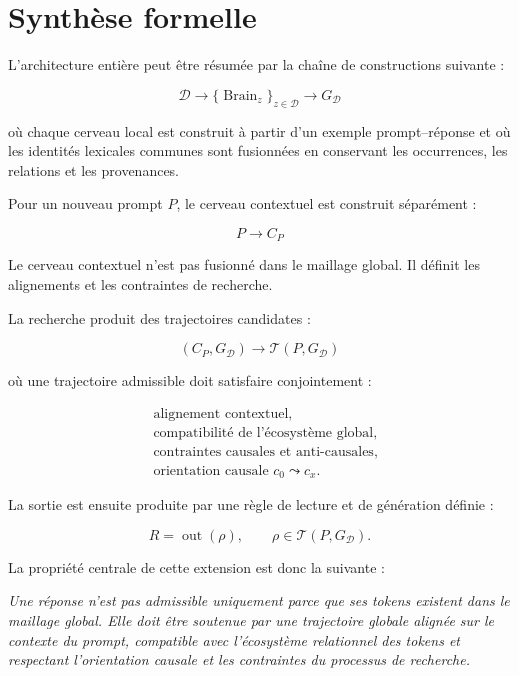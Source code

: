 \documentclass[11pt,a4paper,oneside]{book}
\theoremstyle{remark}
\DeclareMathOperator{\Brain}{Brain}
\newcommand{\Dataset}{\mathcal{D}}
\begin{document}
\section{Synthèse formelle}

L'architecture entière peut être résumée par la chaîne de
constructions suivante :

\[
\boxed{
\Dataset
\longrightarrow
\{\Brain_z\}_{z\in\Dataset}
\longrightarrow
G_{\Dataset}
}
\]

où chaque cerveau local est construit à partir d'un exemple
prompt--réponse et où les identités lexicales communes sont
fusionnées en conservant les occurrences, les relations et les
provenances.

Pour un nouveau prompt \(P\), le cerveau contextuel est construit
séparément :

\[
\boxed{
P\longrightarrow C_P
}
\]

Le cerveau contextuel n'est pas fusionné dans le maillage global.
Il définit les alignements et les contraintes de recherche.

La recherche produit des trajectoires candidates :

\[
\boxed{
(C_P,G_{\Dataset})
\longrightarrow
\mathcal{T}(P,G_{\Dataset})
}
\]

où une trajectoire admissible doit satisfaire conjointement :

\[
\boxed{
\begin{aligned}
&\text{alignement contextuel},\\
&\text{compatibilité de l'écosystème global},\\
&\text{contraintes causales et anti-causales},\\
&\text{orientation causale }c_0\leadsto c_x.
\end{aligned}
}
\]

La sortie est ensuite produite par une règle de lecture et de
génération définie :

\[
\boxed{
R=\operatorname{out}(\rho),
\qquad
\rho\in\mathcal{T}(P,G_{\Dataset}).
}
\]

La propriété centrale de cette extension est donc la suivante :

\begin{minipage}{0.94\textwidth}
\emph{
Une réponse n'est pas admissible uniquement parce que ses tokens
existent dans le maillage global. Elle doit être soutenue par une
trajectoire globale alignée sur le contexte du prompt, compatible
avec l'écosystème relationnel des tokens et respectant l'orientation
causale et les contraintes du processus de recherche.
}
\end{minipage}
\end{document}
